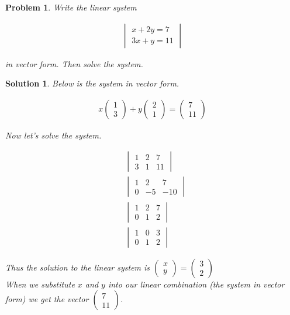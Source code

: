 \documentclass{article}
\newtheorem{problem}{Problem}
\newtheorem*{solution}{Solution}
\begin{document}
\begin{problem}
Write the linear system 

\begin{align*}
\begin{vmatrix}
x + 2y = 7 \\
3x + y = 11
\end{vmatrix}
\end{align*}

in vector form. Then solve the system.
\end{problem}

\begin{solution}
Below is the system in vector form.

\begin{align*}
x \begin{pmatrix} 1 \\ 3 \end{pmatrix} + y \begin{pmatrix} 2 \\ 1 \end{pmatrix} 
= 
\begin{pmatrix}7 \\ 11 \end{pmatrix}
\end{align*}

Now let's solve the system.

\begin{align*}
&\begin{vmatrix}
1 & 2 & 7 \\
3 & 1 & 11
\end{vmatrix} \\
&\begin{vmatrix}
1 & 2 & 7 \\
0 & -5 & -10
\end{vmatrix} \\
&\begin{vmatrix}
1 & 2 & 7 \\
0 & 1 & 2
\end{vmatrix} \\
&\begin{vmatrix}
1 & 0 & 3 \\
0 & 1 & 2
\end{vmatrix}
\end{align*}

Thus the solution to the linear system is
$\begin{pmatrix} x \\ y \end{pmatrix}
=
\begin{pmatrix} 3 \\ 2 \end{pmatrix}$ \\

When we substitute $x$ and $y$ into our linear combination (the system in vector form) we get the vector $\begin{pmatrix} 7 \\ 11 \end{pmatrix}$.

\end{solution}
\end{document}
